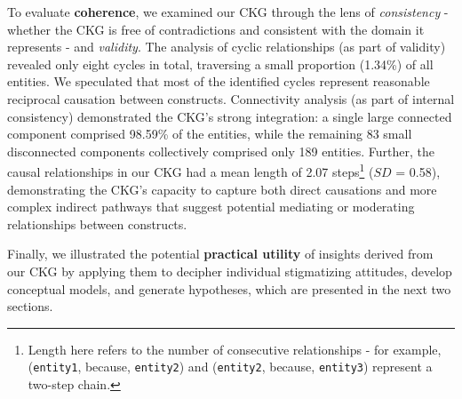To evaluate \textbf{coherence}, we examined our CKG through the lens of \textit{consistency} - whether the CKG is free of contradictions and consistent with the domain it represents - and \textit{validity}. 
The analysis of cyclic relationships (as part of validity) revealed only eight cycles in total, traversing a small proportion (1.34\%) of all entities.
We speculated that most of the identified cycles represent reasonable reciprocal causation \cite{reciprocal_mulatu_2002} between constructs.
Connectivity analysis (as part of internal consistency) demonstrated the CKG's strong integration: a single large connected component comprised 98.59\% of the entities, while the remaining 83 small disconnected components collectively comprised only 189 entities.
Further, the causal relationships in our CKG had a mean length of 2.07 steps\footnote{Length here refers to the number of consecutive relationships - for example, (\texttt{entity1}, because, \texttt{entity2}) and (\texttt{entity2}, because, \texttt{entity3}) represent a two-step chain.} ($SD$ = 0.58), demonstrating the CKG's capacity to capture both direct causations and more complex indirect pathways that suggest potential mediating or moderating relationships between constructs.


Finally, we illustrated the potential \textbf{practical utility} of insights derived from our CKG by applying them to decipher individual stigmatizing attitudes, develop conceptual models, and generate hypotheses, which are presented in the next two sections.


